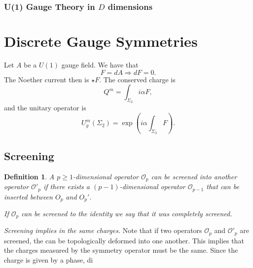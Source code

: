 \documentclass{article}
\newtheorem{definition}{Definition}
\begin{document}
\subsubsection*{U(1) Gauge Theory in $D$ dimensions} 
\section*{Discrete Gauge Symmetries}
Let $A$ be a $U(1)$ gauge field. We have that 
$$
F=dA\Rightarrow dF=0.
$$
The Noether current then is $\star F$.  The conserved charge is 
$$
Q^m=\int_{\Sigma_2}i\alpha F,
$$
and the unitary operator is 
$$
U_g^m(\Sigma_2)=\exp\left(i\alpha\int_{\Sigma_2}F\right).
$$
\subsection*{Screening}
\begin{definition}
	A $p\geq 1$-dimensional operator $\mathcal{O}_p$ can be screened into another operator $\mathcal{O}'_p$ if there exists a $(p-1)$-dimensional operator $\mathcal{O}_{p-1}$ that can be inserted between $O_p$ and $O_p'$. 
	
	If $\mathcal{O}_p$ can be screened to the identity we say that it was completely screened. 
\end{definition}
\textit{Screening implies in the same charges.} Note that if two operators $\mathcal{O}_p$ and $\mathcal{O}'_p$ are screened, the can be topologically deformed into one another. This implies that the charges measured by the symmetry operator must be the same. Since the charge is given by a phase, di





\end{document}
